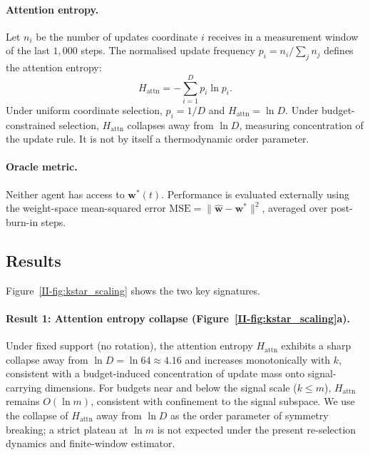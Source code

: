 \documentclass[12pt,a4paper,openany]{book}
\begin{document}
\paragraph{Attention entropy.}
Let $n_i$ be the number of updates coordinate $i$ receives
in a measurement window of the last $1{,}000$ steps.
The normalised update frequency
$p_i = n_i / \sum_j n_j$ defines the attention entropy:
\begin{equation}
\label{II-eq:H_attn}
H_{\mathrm{attn}} = -\sum_{i=1}^{D} p_i \ln p_i.
\end{equation}
Under uniform coordinate selection, $p_i = 1/D$ and
$H_{\mathrm{attn}} = \ln D$.  Under budget-constrained
selection, $H_{\mathrm{attn}}$ collapses away from $\ln D$,
measuring concentration of the update rule.  It is not by itself a
thermodynamic order parameter.

\paragraph{Oracle metric.}
Neither agent has access to $\mathbf{w}^*(t)$.
Performance is evaluated externally using the
weight-space mean-squared error
$\mathrm{MSE} = \|\hat{\mathbf{w}} - \mathbf{w}^*\|^2$,
averaged over post-burn-in steps.

\subsection{Results}
\label{II-subsec:demo_results}

Figure~\ref{II-fig:kstar_scaling} shows the two key signatures.

\paragraph{Result 1: Attention entropy collapse
(Figure~\ref{II-fig:kstar_scaling}a).}
Under fixed support (no rotation), the attention entropy
$H_{\mathrm{attn}}$ exhibits a sharp collapse away from
$\ln D = \ln 64 \approx 4.16$ and increases monotonically
with $k$, consistent with a budget-induced concentration
of update mass onto signal-carrying dimensions.
For budgets near and below the signal scale ($k \leq m$),
$H_{\mathrm{attn}}$ remains $O(\ln m)$, consistent with
confinement to the signal subspace.
We use the collapse of $H_{\mathrm{attn}}$ away from
$\ln D$ as the order parameter of symmetry breaking;
a strict plateau at $\ln m$ is not expected under the
present re-selection dynamics and finite-window estimator.
\end{document}
